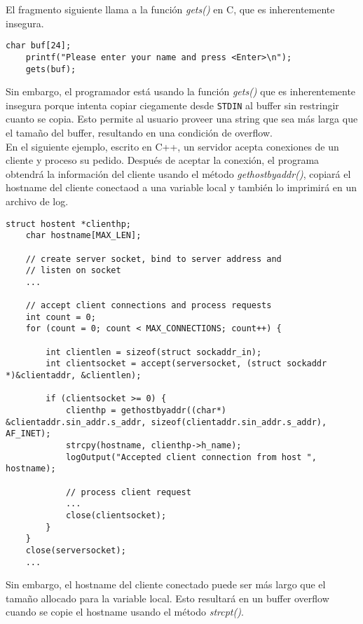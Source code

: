 El fragmento siguiente llama a la función \textit{gets()} en C, que es inherentemente insegura.

\begin{lstlisting}[frame=single]
    char buf[24];
    printf("Please enter your name and press <Enter>\n");
    gets(buf);
\end{lstlisting}

Sin embargo, el programador está usando la función \textit{gets()} que es inherentemente insegura porque intenta copiar ciegamente desde \texttt{STDIN} al buffer sin restringir
cuanto se copia. Esto permite al usuario proveer una string que sea más larga que el tamaño del buffer, resultando en una condición de overflow.\\

En el siguiente ejemplo, escrito en C++, un servidor acepta conexiones de un cliente y proceso su pedido. Después de aceptar la conexión, el programa obtendrá la información del cliente
usando el método \textit{gethostbyaddr()}, copiará el hostname del cliente conectaod a una variable local y también lo imprimirá en un archivo de log.

\begin{lstlisting}[frame=single]
    struct hostent *clienthp;
    char hostname[MAX_LEN];

    // create server socket, bind to server address and
    // listen on socket
    ...

    // accept client connections and process requests
    int count = 0;
    for (count = 0; count < MAX_CONNECTIONS; count++) {

        int clientlen = sizeof(struct sockaddr_in);
        int clientsocket = accept(serversocket, (struct sockaddr *)&clientaddr, &clientlen);

        if (clientsocket >= 0) {
            clienthp = gethostbyaddr((char*) &clientaddr.sin_addr.s_addr, sizeof(clientaddr.sin_addr.s_addr), AF_INET);
            strcpy(hostname, clienthp->h_name);
            logOutput("Accepted client connection from host ", hostname);

            // process client request
            ...
            close(clientsocket);
        }
    }
    close(serversocket);
    ...
\end{lstlisting}

Sin embargo, el hostname del cliente conectado puede ser más largo que el tamaño allocado para la variable local. Esto resultará en un buffer overflow cuando se copie
el hostname usando el método \textit{strcpt()}.

